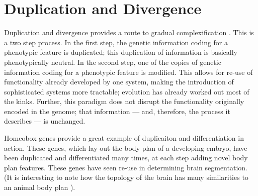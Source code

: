 \section{Duplication and Divergence} \label{sec:duplication_and_divergence}
Duplication and divergence provides a route to gradual complexification \cite[p 202]{Downing2015IntelligenceSystems}. This is a two step process. In the first step, the genetic information coding for a phenotypic feature is duplicated; this duplication of information is basically phenotypically neutral. In the second step, one of the copies of genetic information coding for a phenotypic feature is modified. This allows for re-use of functionality already developed by one system, making the introduction of sophisticated systems more tractable; evolution has already worked out most of the kinks. Further, this paradigm does not disrupt the functionality originally encoded in the genome; that information --- and, therefore, the process it describes --- is unchanged.

Homeobox genes provide a great example of duplicaiton and differentiation in action. These genes, which lay out the body plan of a developing embryo, have been duplicated and differentiated many times, at each step adding novel body plan features\cite[p 203]{Downing2015IntelligenceSystems}. These genes have seen re-use in determining brain segmentation. (It is interesting to note how the topology of the brain has many similarities to an animal body plan \cite[p 201]{Downing2015IntelligenceSystems}).
  
